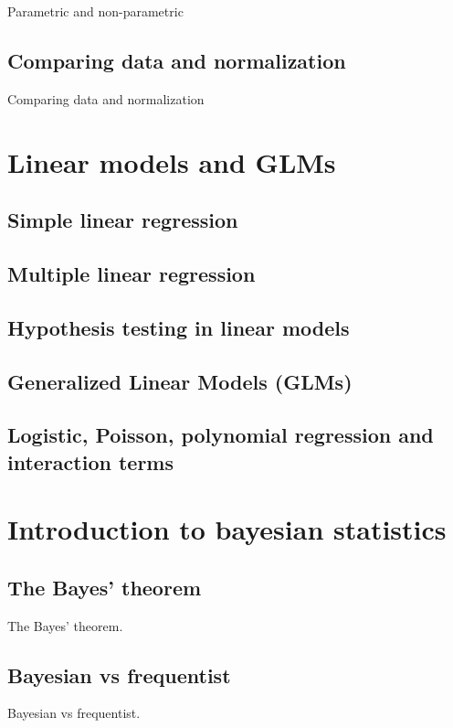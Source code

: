\documentclass{book}
\begin{document}
Parametric and non-parametric

\newpage

\section{Comparing data and normalization}
Comparing data and normalization

\chapter{Linear models and GLMs}

\section{Simple linear regression}

\section{Multiple linear regression}

\section{Hypothesis testing in linear models}

\section{Generalized Linear Models (GLMs)}

\section{Logistic, Poisson, polynomial regression and interaction terms}

\chapter{Introduction to bayesian statistics}

\section{The Bayes' theorem}
The Bayes' theorem.

\section{Bayesian vs frequentist}
Bayesian vs frequentist.
\end{document}
